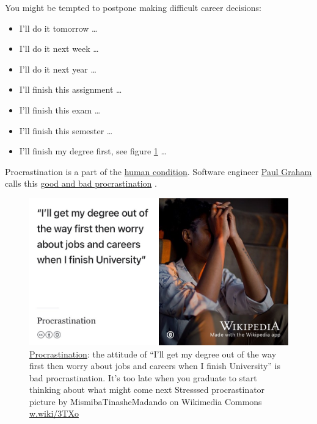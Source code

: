 \documentclass[
]{book}
\providecommand{\tightlist}{%
  \setlength{\itemsep}{0pt}\setlength{\parskip}{0pt}}
\begin{document}
You might be tempted to postpone making difficult career decisions:

\begin{itemize}
\tightlist
\item
  I'll do it tomorrow \ldots{}
\item
  I'll do it next week \ldots{}
\item
  I'll do it next year \ldots{}
\item
  I'll finish this assignment \ldots{}
\item
  I'll finish this exam \ldots{}
\item
  I'll finish this semester \ldots{}
\item
  I'll finish my degree first, see figure \ref{fig:procrastination-fig} \ldots{}
\end{itemize}

Procrastination is a part of the \href{https://en.wikipedia.org/wiki/Human_condition}{human condition}. Software engineer \href{https://en.wikipedia.org/wiki/Paul_Graham_(programmer)}{Paul Graham} calls this \href{http://paulgraham.com/procrastination.html}{good and bad procrastination} \citep{procrastination}.

\begin{figure}

{\centering \includegraphics[width=0.99\linewidth]{images/procrastinator} 

}

\caption{\href{https://en.wikipedia.org/wiki/Procrastination}{Procrastination}: the attitude of ``I'll get my degree out of the way first then worry about jobs and careers when I finish University'' is bad procrastination. It's too late when you graduate to start thinking about what might come next \citep{procrastination} Stresssed procrastinator picture by MismibaTinasheMadando on Wikimedia Commons \href{https://w.wiki/3TXo}{w.wiki/3TXo}}\label{fig:procrastination-fig}
\end{figure}
\end{document}
